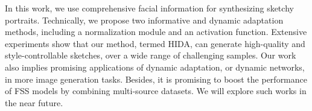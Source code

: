 \documentclass[10pt,twocolumn,letterpaper]{article}
\begin{document}
In this work, we use comprehensive facial information for synthesizing sketchy portraits. Technically, we propose two informative and dynamic adaptation methods, including a normalization module and an activation function. Extensive experiments show that our method, termed HIDA, can generate high-quality and style-controllable sketches, over a wide range of challenging samples. 
Our work also implies promising applications of dynamic adaptation, or dynamic networks, in more image generation tasks. 
Besides, it is promising to boost the performance of FSS models by combining multi-source datasets. We will explore such works in the near future.


{\small


}
\end{document}
